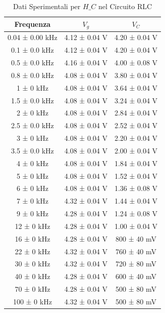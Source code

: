 \documentclass[a4paper]{article}
\begin{document}
\begin{table}[htbp]
\centering
\begin{tabular}{|c|c|c|}
\hline
Frequenza & $V_g$ & $V_C$ \\\hline\hline
0.04 ± 0.00 kHz & 4.12 ± 0.04 V & 4.20 ± 0.04 V \\
0.1 ± 0.0 kHz & 4.12 ± 0.04 V & 4.20 ± 0.04 V \\
0.5 ± 0.0 kHz & 4.16 ± 0.04 V & 4.00 ± 0.08 V \\
0.8 ± 0.0 kHz & 4.08 ± 0.04 V & 3.80 ± 0.04 V \\
1 ± 0 kHz & 4.08 ± 0.04 V & 3.64 ± 0.04 V \\
1.5 ± 0.0 kHz & 4.08 ± 0.04 V & 3.24 ± 0.04 V \\
2 ± 0 kHz & 4.08 ± 0.04 V & 2.84 ± 0.04 V \\
2.5 ± 0.0 kHz & 4.08 ± 0.04 V & 2.52 ± 0.04 V \\
3 ± 0 kHz & 4.08 ± 0.04 V & 2.20 ± 0.04 V \\
3.5 ± 0.0 kHz & 4.08 ± 0.04 V & 2.00 ± 0.04 V \\
4 ± 0 kHz & 4.08 ± 0.04 V & 1.84 ± 0.04 V \\
5 ± 0 kHz & 4.08 ± 0.04 V & 1.52 ± 0.04 V \\
6 ± 0 kHz & 4.08 ± 0.04 V & 1.36 ± 0.08 V \\
7 ± 0 kHz & 4.32 ± 0.04 V & 1.44 ± 0.04 V \\
9 ± 0 kHz & 4.28 ± 0.04 V & 1.24 ± 0.08 V \\
12 ± 0 kHz & 4.28 ± 0.04 V & 1.00 ± 0.04 V \\
16 ± 0 kHz & 4.28 ± 0.04 V & 800 ± 40 mV \\
22 ± 0 kHz & 4.32 ± 0.04 V & 760 ± 40 mV \\
30 ± 0 kHz & 4.32 ± 0.04 V & 720 ± 80 mV \\
40 ± 0 kHz & 4.28 ± 0.04 V & 600 ± 40 mV \\
70 ± 0 kHz & 4.28 ± 0.04 V & 500 ± 80 mV \\
100 ± 0 kHz & 4.32 ± 0.04 V & 500 ± 80 mV \\
\hline
\end{tabular}
\caption{Dati Sperimentali per $H\_C$ nel Circuito RLC}
\end{table}
\end{document}
